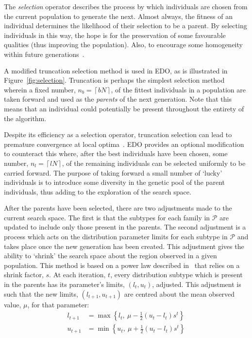 The \emph{selection} operator describes the process by which individuals are
chosen from the current population to generate the next. Almost always, the
fitness of an individual determines the likelihood of their selection to be a
parent. By selecting individuals in this way, the hope is for the preservation
of some favourable qualities (thus improving the population). Also, to encourage
some homogeneity within future generations~\cite{Back1994}.


A modified truncation selection method is used in EDO, as is illustrated in
Figure~\ref{fig:selection}. Truncation is perhaps the simplest selection method
wherein a fixed number, \(n_b = \left\lceil b N\right\rceil\), of the fittest
individuals in a population are taken forward and used as the \emph{parents} of
the next generation. Note that this means that an individual could potentially
be present throughout the entirety of the algorithm.

Despite its efficiency as a selection operator, truncation selection can lead to
premature convergence at local optima~\cite{Jebari2013,Motoki2002}. EDO provides
an optional modification to counteract this where, after the best individuals
have been chosen, some number, \(n_l = \left\lceil l N\right\rceil\), of the
remaining individuals can be selected uniformly to be carried forward. The
purpose of taking forward a small number of `lucky' individuals is to introduce
some diversity in the genetic pool of the parent individuals, thus adding to the
exploration of the search space.

After the parents have been selected, there are two adjustments made to the
current search space. The first is that the subtypes for each family in
\(\mathcal{P}\) are updated to include only those present in the parents. The
second adjustment is a process which acts on the distribution parameter limits
for each subtype in \(\mathcal{P}\) and takes place once the new generation has
been created. This adjustment gives the ability to `shrink' the search space
about the region observed in a given population. This method is based on a power
law described in~\cite{Amirjanov2016} that relies on a shrink factor, \(s\). At
each iteration, \(t\), every distribution subtype which is present in the
parents has its parameter's limits, \(\left(l_t, u_t\right)\), adjusted. This
adjustment is such that the new limits, \(\left(l_{t+1}, u_{t+1}\right)\) are
centred about the mean observed value, \(\mu\), for that parameter:
\begin{align}
    \label{eq:shrinking_lower}
    l_{t+1}&= \max \left\{l_t, \ \mu - \frac{1}{2} (u_t - l_t) s^t\right\}\\
    \label{eq:shrinking_upper}
    u_{t+1}&= \min \left\{u_t, \ \mu + \frac{1}{2} (u_t - l_t) s^t\right\}
\end{align}

